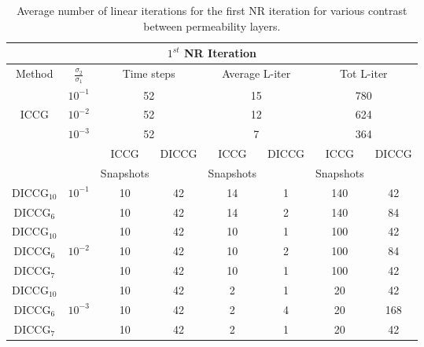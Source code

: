 \documentclass[12pt]{article}
\begin{document}
\begin{table}[!ht]\centering
\begin{minipage}{1\textwidth}
\vspace{-10pt}
\centering
\begin{tabular}{ |c|c|c|c|c|c|c|c|} 
  \hline
 \multicolumn{8}{|c|}{$1^{st}$ NR Iteration}  \\
\hline
Method& $\frac{\sigma_2}{\sigma_1}$ & \multicolumn{2}{c|}{Time steps} &\multicolumn{2}{c|}{Average L-iter} & \multicolumn{2}{c|}{Tot L-iter}\\
\hline
&$10^{-1}$ &\multicolumn{2}{c|}{52} & \multicolumn{2}{c|}{15}& \multicolumn{2}{c|}{780} \\
ICCG&$10^{-2}$ & \multicolumn{2}{c|}{52}& \multicolumn{2}{c|}{12}& \multicolumn{2}{c|}{624}\\
&$10^{-3}$ & \multicolumn{2}{c|}{52} &\multicolumn{2}{c|}{7} & \multicolumn{2}{c|}{364}\\
\hline
&&ICCG&DICCG&ICCG&DICCG&ICCG&DICCG\\
&&Snapshots&&Snapshots&&Snapshots&\\
\hline
DICCG$_{10}$&$10^{-1}$ &10&42 &14&1 &140&42 \\
DICCG$_6$& &10&42 &14&2 &140&84 \\
\hline
DICCG$_{10}$& &10&42 & 10&1& 100&42\\
DICCG$_6$&$10^{-2}$ &10&42 & 10&2& 100&84\\
DICCG$_7$& &10&42 & 10&1& 100&42\\
\hline
DICCG$_{10}$& & 10&42 & 2&1&20&42 \\
DICCG$_6$&$10^{-3}$ & 10&42 & 2&4&20&168 \\
DICCG$_7$& & 10&42 & 2&1&20&42 \\
 \hline
 \end{tabular}
\caption{Average number of linear iterations for the first NR iteration for various contrast between permeability layers. }\label{table:liter1}
\end{minipage}
\end{table}
\end{document}

